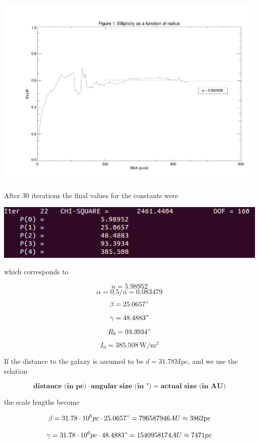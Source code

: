 \documentclass[a4paper,12pt]{article}
\begin{document}
\centerline{\includegraphics[scale=0.6,page=6]{ellipticity.pdf}}%

After 30 iterations the final values for the constants were

\vspace*{0.5cm}
\centerline{\includegraphics[scale=0.6]{constants.png}}%

which corresponds to

$$n = 5.98952$$
$$\alpha = 0.5/n = 0.083479 $$
$$\beta = 25.0657 "$$
$$\gamma = 48.4883 "$$
$$R_b = 93.3934 "$$
$$I_0 = 385.508 \, \text{W}/\text{m}^2$$

If the distance to the galaxy is assumed to be $d=31.78\text{Mpc}$, and we use the relation

$$ \textbf{distance (in pc)} \cdot \textbf{angular size (in ")} = \textbf{actual size (in AU)} $$

the scale lengths become

$$ \beta = 31.78 \cdot 10^6 pc \cdot 25.0657" = 796587946 AU \approx 3862 \text{pc} $$

$$ \gamma = 31.78 \cdot 10^6 pc \cdot 48.4883" = 1540958174 AU \approx 7471 \text{pc} $$
\end{document}
